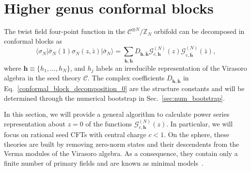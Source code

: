 \documentclass[a4paper,11pt]{article}
\begin{document}
\section{Higher genus conformal blocks}\label{sec:conf_blocks}
The twist field four-point function in the $\mathcal{C}^{\otimes N}/\mathbb{Z}_N$ 
orbifold can be decomposed in conformal blocks as
\begin{equation}\label{conformal_block_decomposition_0}
 \langle \sigma_N | \bar{\sigma}_N(1) \sigma_N (z, \bar{z})|\bar{\sigma}_N\rangle=
 \sum_{\boldsymbol{h},\boldsymbol{\bar{h}}} D_{\boldsymbol{h}, \boldsymbol{\bar{h}}}
 \mathcal{G}_{c, \boldsymbol{h}}^{(N)}(z)\mathcal{G}_{c,\boldsymbol{\bar{h}}}^{(N)}(\bar{z}),
\end{equation}
where $\boldsymbol{h}\equiv\{h_1, \dots, h_N\}$, and $h_j$ labels an irreducible
representation of the Virasoro algebra in the seed theory $\mathcal{C}$. The complex 
coefficients  $D_{\boldsymbol{h}, \boldsymbol{\bar{h}}}$ in Eq.~\eqref{conformal_block_decomposition_0} 
are the structure constants and will be determined through the numerical bootstrap in Sec.~\ref{sec:num_bootstrap}.

In this section, we will provide a general algorithm to calculate power series representation about $z=0$ of the functions  $\mathcal{G}_{c, \boldsymbol{h}}^{(N)}(z)$. In particular, we will focus on rational seed CFTs  with central charge $c<1$. On the sphere, these theories are built by removing zero-norm states and their descendents from the Verma modules of the Virasoro algebra.  As a consequence, they contain only a finite number of primary fields and are known as minimal models~\cite{BPZ}. 
\end{document}
